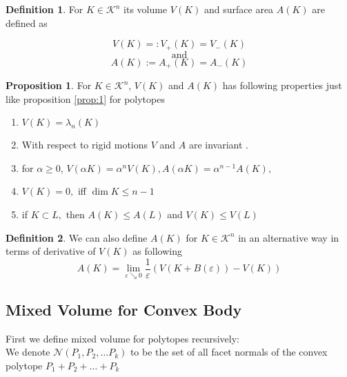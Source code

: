 \documentclass[oneside]{book}
\theoremstyle{definition}
\newtheorem{mydef}{Definition}[chapter]
\newtheorem{prop}{Proposition}
\begin{document}
 \begin{mydef}
 For $K \in \mathcal{K}^n$ its volume $V(K) $ and surface area $A(K)$ are defined as 


\[
  V(K) =: V_{+}(K)=V_{-}(K)
\]
$$\text{and} $$
\[
 A(K) :=  A_{+}(K) = A_{-}(K) 
\]
 
\end{mydef}
 \begin{prop}
 

For $ K \in \mathcal{K}^n $,  $V(K) $ and $A(K) $ has following properties just like proposition \ref{prop:1} for polytopes
\begin{enumerate}
    \item  $V(K)=\lambda_{n}(K)$
\item With respect to rigid motions $V$ and $A$ are invariant .
\item  for $\alpha \geq 0$, $V(\alpha K)=\alpha^{n} V(K), A(\alpha K)=\alpha^{n-1} A(K),$ 
\item $V(K)=0,$ iff $\operatorname{dim} K \leq n-1$
\item if $K \subset L,$ then  $A(K) \leq A(L)$ and $V(K) \leq V(L)$

\end{enumerate}

 \end{prop}
\begin{mydef}
We can also define $A(K)$ for $K \in \mathcal{K}^n$ in an alternative way in terms of derivative of $V(K)$ as following \\
\begin{equation}
\label{eq48}
A(K)=\lim _{\varepsilon \searrow 0} \frac{1}{\varepsilon}(V(K+B(\varepsilon))-V(K))
\end{equation}



\end{mydef}

\newpage


\subsection{Mixed Volume for Convex Body}
First we define mixed volume for polytopes recursively:  \\
We denote  $ \mathcal{N}(P_{1},P_{2},\ldots P_{k})$ to be the set of all facet normals of the convex polytope $P_{1}+P_{2}+ \ldots + P_{k}$
\end{document}
